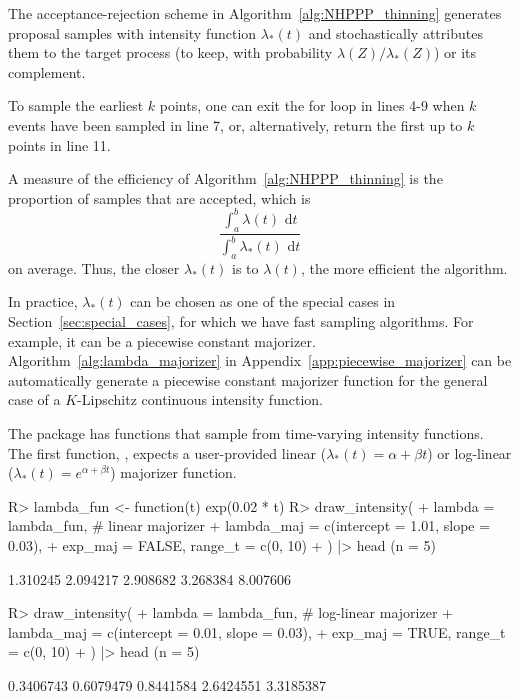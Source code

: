 \documentclass[article]{jss}\usepackage[]{graphicx}\usepackage[]{xcolor}
\newcommand{\fct}[1]{\code{#1()}}
\begin{document}
The acceptance-rejection scheme in Algorithm~\ref{alg:NHPPP_thinning} generates proposal samples with intensity function $\lambda_*(t)$ and stochastically attributes them to the target process (to keep, with probability $\lambda(Z)/\lambda_*(Z)$) or its complement.



To sample the earliest $k$ points, one can exit the for loop in lines 4-9 when $k$ events have been sampled in line 7, or, alternatively, return the first up to $k$ points in line 11.

A measure of the efficiency of Algorithm~\ref{alg:NHPPP_thinning} is the proportion of samples that are accepted, which is
\begin{equation}\label{eq:thinning-efficiency}
\frac{\int_a^b{\lambda(t) \textrm{ d}t}}{\int_a^b{\lambda_*(t) \textrm{ d}t}}
\end{equation}
on average. Thus, the closer $\lambda_*(t)$ is to $\lambda(t)$, the more efficient the algorithm.

In practice, $\lambda_*(t)$ can be chosen as one of the special cases in Section~\ref{sec:special_cases}, for which we have fast sampling algorithms. For example, it can be a piecewise constant majorizer. Algorithm~\ref{alg:lambda_majorizer} in Appendix~\ref{app:piecewise_majorizer} can be automatically generate a piecewise constant majorizer function for the general case of a $K$-Lipschitz continuous intensity function.

The  package has functions that sample from time-varying intensity functions. The first function, \fct{draw\_intensity}, expects a user-provided linear ($\lambda_*(t) = \alpha + \beta t$) or log-linear ($\lambda_*(t) = e^{\alpha + \beta t}$) majorizer function.

\begin{Schunk}
\begin{Sinput}
R> lambda_fun <- function(t) exp(0.02 * t)
R> draw_intensity(
+    lambda = lambda_fun, # linear majorizer
+    lambda_maj = c(intercept = 1.01, slope = 0.03),
+    exp_maj = FALSE, range_t = c(0, 10)
+  ) |> head (n = 5)
\end{Sinput}
\begin{Soutput}
[1] 1.310245 2.094217 2.908682 3.268384 8.007606
\end{Soutput}
\begin{Sinput}
R> draw_intensity(
+    lambda = lambda_fun, # log-linear majorizer
+    lambda_maj = c(intercept = 0.01, slope = 0.03),
+    exp_maj = TRUE, range_t = c(0, 10)
+  ) |> head (n = 5)
\end{Sinput}
\begin{Soutput}
[1] 0.3406743 0.6079479 0.8441584 2.6424551 3.3185387
\end{Soutput}
\end{Schunk}
\end{document}
